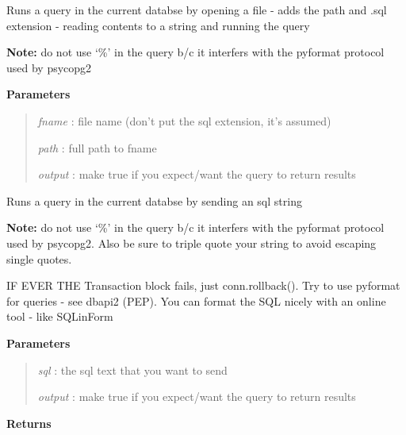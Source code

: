\documentclass[letterpaper,10pt,openany,oneside]{sphinxmanual}
\begin{document}
\begin{fulllineitems}
\begin{fulllineitems}
\end{fulllineitems}


\begin{fulllineitems}
\label{code:Database.Database.qryFromFile}
Runs a query in the current databse by opening a file - adds the path and 
.sql extension - reading contents to a string and running the query

\textbf{Note:} do not use `\%' in the query b/c it interfers with the pyformat protocol
used by psycopg2

\textbf{Parameters}
\begin{quote}

\emph{fname}  : file name (don't put the sql extension, it's assumed)

\emph{path}   : full path to fname

\emph{output} : make true if you expect/want the query to return results
\end{quote}

\end{fulllineitems}


\begin{fulllineitems}
\label{code:Database.Database.qryFromText}
Runs a query in the current databse by sending an sql string

\textbf{Note:} do not use `\%' in the query b/c it interfers with the pyformat protocol
used by psycopg2. Also be sure to triple quote your string to avoid escaping single quotes.

IF EVER THE Transaction block fails, just conn.rollback(). Try to use pyformat for queries - see dbapi2 (PEP).
You can format the SQL nicely with an online tool - like SQLinForm

\textbf{Parameters}
\begin{quote}

\emph{sql}    : the sql text that you want to send

\emph{output} : make true if you expect/want the query to return results
\end{quote}

\textbf{Returns}
\begin{quote}


\end{quote}
\end{fulllineitems}
\end{fulllineitems}
\end{document}
